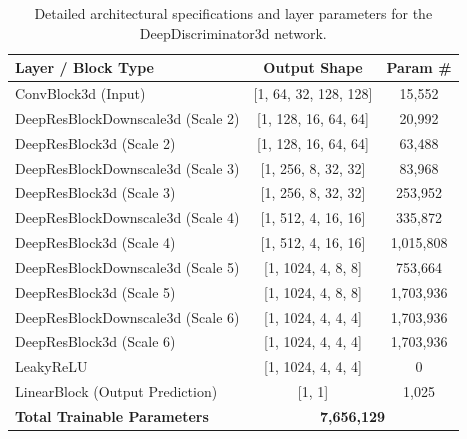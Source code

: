 \begin{table}[htbp]
    \centering
    \renewcommand{\arraystretch}{1.2}
    \begin{tabular}{p{}cc}
        \hline
        \textbf{Layer / Block Type} & \textbf{Output Shape} & \textbf{Param \#} \\
        \hline
        ConvBlock3d (Input) & [1, 64, 32, 128, 128] & 15,552 \\
        DeepResBlockDownscale3d (Scale 2) & [1, 128, 16, 64, 64] & 20,992 \\
        DeepResBlock3d (Scale 2) & [1, 128, 16, 64, 64] & 63,488 \\
        DeepResBlockDownscale3d (Scale 3) & [1, 256, 8, 32, 32] & 83,968 \\
        DeepResBlock3d (Scale 3) & [1, 256, 8, 32, 32] & 253,952 \\
        DeepResBlockDownscale3d (Scale 4) & [1, 512, 4, 16, 16] & 335,872 \\
        DeepResBlock3d (Scale 4) & [1, 512, 4, 16, 16] & 1,015,808 \\
        DeepResBlockDownscale3d (Scale 5) & [1, 1024, 4, 8, 8] & 753,664 \\
        DeepResBlock3d (Scale 5) & [1, 1024, 4, 8, 8] & 1,703,936 \\
        DeepResBlockDownscale3d (Scale 6) & [1, 1024, 4, 4, 4] & 1,703,936 \\
        DeepResBlock3d (Scale 6) & [1, 1024, 4, 4, 4] & 1,703,936 \\
        LeakyReLU & [1, 1024, 4, 4, 4] & 0 \\
        LinearBlock (Output Prediction) & [1, 1] & 1,025 \\
        \hline
        \textbf{Total Trainable Parameters} & \multicolumn{2}{c}{\textbf{7,656,129}} \\
        \hline
    \end{tabular}
    \caption{Detailed architectural specifications and layer parameters for the DeepDiscriminator3d network.}
    \label{tab:best_discriminator_architecture}
\end{table}

